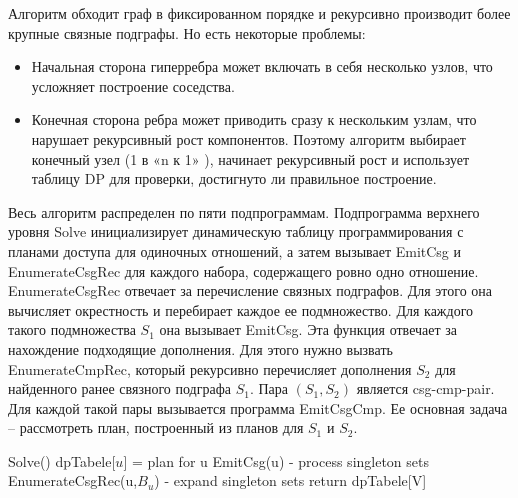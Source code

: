 \documentclass[12pt]{article}
\begin{document}
\begin{flushleft}
Алгоритм обходит граф в фиксированном порядке и рекурсивно производит более крупные связные подграфы. Но есть некоторые проблемы: 
\begin{itemize}
    \item Начальная сторона гиперребра может включать в себя несколько узлов, что усложняет построение соседства. 
    \item Конечная сторона ребра может приводить сразу к нескольким узлам, что нарушает рекурсивный рост компонентов. Поэтому алгоритм выбирает конечный узел (1 в «n к 1» ), начинает рекурсивный рост и использует таблицу DP для проверки, достигнуто ли правильное построение.
\end{itemize}
Весь алгоритм распределен по пяти подпрограммам. Подпрограмма верхнего 
уровня Solve инициализирует динамическую таблицу программирования с 
планами доступа для одиночных отношений, а затем вызывает EmitCsg 
и EnumerateCsgRec для каждого набора, содержащего ровно одно 
отношение.  EnumerateCsgRec отвечает за перечисление связных подграфов.
 Для этого она вычисляет окрестность и перебирает каждое ее 
 подмножество. Для каждого такого подмножества $S_1$ она вызывает 
 EmitCsg. Эта функция отвечает за нахождение  подходящие дополнения. 
 Для этого нужно вызвать EnumerateCmpRec, который рекурсивно перечисляет 
 дополнения $S_2$ для найденного ранее связного подграфа $S_1$. 
 Пара $(S_1, S_2)$ является csg-cmp-pair. Для каждой такой пары 
 вызывается программа EmitCsgCmp. Ее основная задача -- рассмотреть 
 план, построенный из планов для $S_1$  и $S_2$.


\begin{algorithm}
    \begin{algorithmic}[1]
        \State Solve()
            \State dpTabele[${u}$] = plan for u
        \EndFor
            \State EmitCsg({u}) - process singleton sets
            \State EnumerateCsgRec({u},$B_u$) - expand singleton sets
        \EndFor
        return dpTabele[V]
    \end{algorithmic}
\end{algorithm}

\begin{center}
\end{center}
\end{flushleft}
\end{document}
